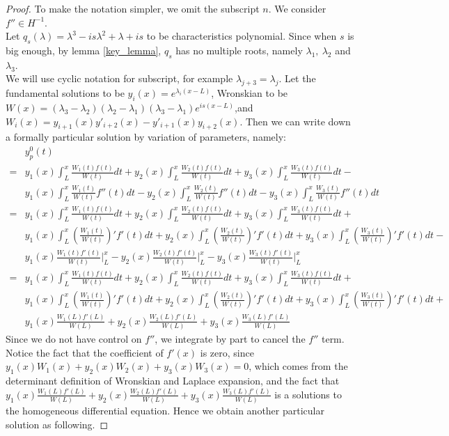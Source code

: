 \documentclass[a4paper,draft]{amsproc}
\theoremstyle{plain}
\theoremstyle{definition}
\theoremstyle{remark}
\numberwithin{equation}{section}
\begin{document}
\begin{proof}
To make the notation simpler, we omit the subscript $n$. We consider $f''\in H^{-1}$. \\
Let $q_s(\lambda)= \lambda^3-is\lambda^2+\lambda+is$ to be characteristics polynomial. Since when $s$ is big enough, by lemma \ref{key_lemma},  $q_s$ has no multiple roots, namely $\lambda_1,\ \lambda_2$ and $\lambda_3$.\\
We will use cyclic notation for subscript, for example $\lambda_{j+3}=\lambda_j$.
 Let the fundamental solutions to be $y_i(x)=e^{\lambda_i (x-L)}$, Wronskian to be $W(x)=(\lambda_3-\lambda_2)(\lambda_2-\lambda_1)(\lambda_3-\lambda_1)e^{is(x-L)}$,and $W_i(x)=y_{i+1}(x)y'_{i+2}(x)-y'_{i+1}(x)y_{i+2}(x)$.
Then we can write down a formally particular solution by variation of parameters, namely:\\
\begin{equation*} 
	\begin{split}
		&y^0_p(t)\\=&y_1(x)\int_{L}^{x}\frac{W_1(t)f(t)}{W(t)} d t+y_2(x)\int_{L}^{x}\frac{W_2(t)f(t)}{W(t)} d t+y_3(x)\int_{L}^{x}\frac{W_3(t)f(t)}{W(t)} d t-\\&y_1(x)\int_{L}^{x}\frac{W_1(t)}{W(t)}f''(t) d t-y_2(x)\int_{L}^{x}\frac{W_2(t)}{W(t)}f''(t) d t-y_3(x)\int_{L}^{x}\frac{W_3(t)}{W(t)}f''(t) d t\\
		=&y_1(x)\int_{L}^{x}\frac{W_1(t)f(t)}{W(t)} d t+y_2(x)\int_{L}^{x}\frac{W_2(t)f(t)}{W(t)} d t+y_3(x)\int_{L}^{x}\frac{W_3(t)f(t)}{W(t)} d t+\\&y_1(x)\int_{L}^{x}(\frac{W_1(t)}{W(t)})'f'(t) d t+y_2(x)\int_{L}^{x}(\frac{W_2(t)}{W(t)})'f'(t) d t+y_3(x)\int_{L}^{x}(\frac{W_3(t)}{W(t)})'f'(t) d t
		-\\&y_1(x)\frac{W_1(t)f'(t)}{W(t)} \bigg|_L^x 
		-y_2(x)\frac{W_2(t)f'(t)}{W(t)} \bigg|_L^x
		-y_3(x)\frac{W_3(t)f'(t)}{W(t)} \bigg|_L^x\\
		=&y_1(x)\int_{L}^{x}\frac{W_1(t)f(t)}{W(t)} d t+y_2(x)\int_{L}^{x}\frac{W_2(t)f(t)}{W(t)} d t+y_3(x)\int_{L}^{x}\frac{W_3(t)f(t)}{W(t)} d t+\\&y_1(x)\int_{L}^{x}(\frac{W_1(t)}{W(t)})'f'(t) d t+y_2(x)\int_{L}^{x}(\frac{W_2(t)}{W(t)})'f'(t) d t+y_3(x)\int_{L}^{x}(\frac{W_3(t)}{W(t)})'f'(t) d t
		+\\&y_1(x)\frac{W_1(L)f'(L)}{W(L)}
		+y_2(x)\frac{W_2(L)f'(L)}{W(L)} 
		+y_3(x)\frac{W_3(L)f'(L)}{W(L)} 
	\end{split}
\end{equation*}
Since we do not have control on $f''$, we integrate by part to cancel the $f''$ term. Notice the fact that the coefficient of $f'(x)$ is zero, since $y_1(x)W_1(x)+y_2(x)W_2(x)+y_3(x)W_3(x)=0$, which comes from the determinant definition of Wronskian and Laplace expansion, and the fact that $y_1(x)\frac{W_1(L)f'(L)}{W(L)}+y_2(x)\frac{W_2(L)f'(L)}{W(L)} +y_3(x)\frac{W_3(L)f'(L)}{W(L)}$ is a solutions to the homogeneous differential equation. Hence we obtain another particular solution as following.

\end{proof}
\end{document}
